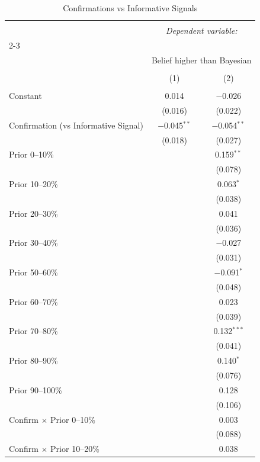 
\begin{table}[!htbp] \centering 
  \caption{Confirmations vs Informative Signals} 
  \label{} 
\begin{tabular}{@{\extracolsep{5pt}}lcc} 
\\[-1.8ex]\hline 
\hline \\[-1.8ex] 
 & \multicolumn{2}{c}{\textit{Dependent variable:}} \\ 
\cline{2-3} 
\\[-1.8ex] & \multicolumn{2}{c}{Belief higher than Bayesian} \\ 
\\[-1.8ex] & (1) & (2)\\ 
\hline \\[-1.8ex] 
 Constant & 0.014 & $-$0.026 \\ 
  & (0.016) & (0.022) \\ 
  Confirmation (vs Informative Signal) & $-$0.045$^{**}$ & $-$0.054$^{**}$ \\ 
  & (0.018) & (0.027) \\ 
  Prior 0--10\% &  & 0.159$^{**}$ \\ 
  &  & (0.078) \\ 
  Prior 10--20\% &  & 0.063$^{*}$ \\ 
  &  & (0.038) \\ 
  Prior 20--30\% &  & 0.041 \\ 
  &  & (0.036) \\ 
  Prior 30--40\% &  & $-$0.027 \\ 
  &  & (0.031) \\ 
  Prior 50--60\% &  & $-$0.091$^{*}$ \\ 
  &  & (0.048) \\ 
  Prior 60--70\% &  & 0.023 \\ 
  &  & (0.039) \\ 
  Prior 70--80\% &  & 0.132$^{***}$ \\ 
  &  & (0.041) \\ 
  Prior 80--90\% &  & 0.140$^{*}$ \\ 
  &  & (0.076) \\ 
  Prior 90--100\% &  & 0.128 \\ 
  &  & (0.106) \\ 
  Confirm $\times$ Prior 0--10\% &  & 0.003 \\ 
  &  & (0.088) \\ 
  Confirm $\times$ Prior 10--20\% &  & 0.038 \\ 

\end{tabular}
\end{table}
